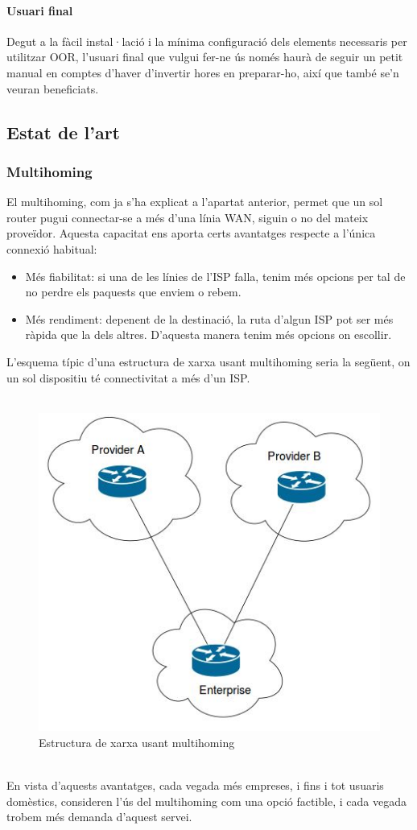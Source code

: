 \documentclass[11pt]{article}
\begin{document}
\paragraph{Usuari final}
Degut a la fàcil instal·lació i la mínima configuració dels elements necessaris per utilitzar OOR, l’usuari final que vulgui fer-ne ús només haurà de seguir un petit manual en comptes d’haver d’invertir hores en preparar-ho, així que també se’n veuran beneficiats.
\newpage
\subsection{Estat de l'art}
\subsubsection{Multihoming}
El multihoming, com ja s’ha explicat a l’apartat anterior, permet que un sol router pugui connectar-se a més d’una línia WAN, siguin o no del mateix proveïdor. Aquesta capacitat ens aporta certs avantatges respecte a l'única connexió habitual:
\begin{itemize}
\item Més fiabilitat: si una de les línies de l’ISP falla, tenim més opcions per tal de no perdre els paquests que enviem o rebem.
\item Més rendiment: depenent de la destinació, la ruta d’algun ISP pot ser més ràpida que la dels altres. D’aquesta manera tenim més opcions on escollir. 
\end{itemize}
L’esquema típic d’una estructura de xarxa usant multihoming seria la següent, on un sol dispositiu té connectivitat a més d’un ISP.\\
\\
\begin{figure}[h]
	\centering
	\includegraphics{multihoming}
	\caption{Estructura de xarxa usant multihoming}
\end{figure}
\\
En vista d'aquests avantatges, cada vegada més empreses, i fins i tot usuaris domèstics, consideren l'ús del multihoming com una opció factible, i cada vegada trobem més demanda d'aquest servei.
\end{document}

